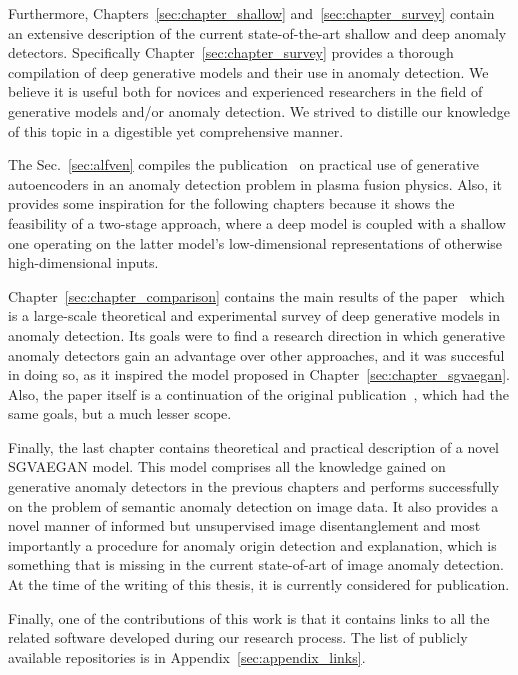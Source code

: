 Furthermore, Chapters~\ref{sec:chapter_shallow} and~\ref{sec:chapter_survey} contain an extensive description of the current state-of-the-art shallow and deep anomaly detectors. Specifically Chapter~\ref{sec:chapter_survey} provides a thorough compilation of deep generative models and their use in anomaly detection. We believe it is useful both for novices and experienced researchers in the field of generative models and/or anomaly detection. We strived to distille our knowledge of this topic in a digestible yet comprehensive manner.

The Sec.~\ref{sec:alfven} compiles the publication~\cite{vskvara2020detection} on practical use of generative autoencoders in an anomaly detection problem in plasma fusion physics. Also, it provides some inspiration for the following chapters because it shows the feasibility of a two-stage approach, where a deep model is coupled with a shallow one operating on the latter model's low-dimensional representations of otherwise high-dimensional inputs.

Chapter~\ref{sec:chapter_comparison} contains the main results of the paper~\cite{vskvara2021comparison} which is a large-scale theoretical and experimental survey of deep generative models in anomaly detection. Its goals were to find a research direction in which generative anomaly detectors gain an advantage over other approaches, and it was succesful in doing so, as it inspired the model proposed in Chapter~\ref{sec:chapter_sgvaegan}. Also, the paper itself is a continuation of the original publication~\cite{vskvara2018generative}, which had the same goals, but a much lesser scope.

Finally, the last chapter contains theoretical and practical description of a novel SGVAEGAN model. This model comprises all the knowledge gained on generative anomaly detectors in the previous chapters and performs successfully on the problem of semantic anomaly detection on image data. It also provides a novel manner of informed but unsupervised image disentanglement and most importantly a procedure for anomaly origin detection and explanation, which is something that is missing in the current state-of-art of image anomaly detection. At the time of the writing of this thesis, it is currently considered for publication.

Finally, one of the contributions of this work is that it contains links to all the related software developed during our research process. The list of publicly available repositories is in Appendix~\ref{sec:appendix_links}.

